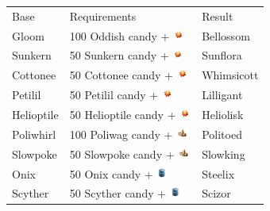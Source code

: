 \begin{table}[ht]
\footnotesize
\begin{center}
  \begin{tabular}{lll}
    Base & Requirements & Result \\
    \Midrule
    Gloom & 100 Oddish candy + \includegraphics[width=1em,height=1em]{images/sunstone.png} & Bellossom \\
    Sunkern & 50 Sunkern candy + \includegraphics[width=1em,height=1em]{images/sunstone.png} & Sunflora \\
    Cottonee & 50 Cottonee candy + \includegraphics[width=1em,height=1em]{images/sunstone.png} & Whimsicott \\
    Petilil & 50 Petilil candy + \includegraphics[width=1em,height=1em]{images/sunstone.png} & Lilligant \\
    Helioptile & 50 Helioptile candy + \includegraphics[width=1em,height=1em]{images/sunstone.png} & Heliolisk \\
    Poliwhirl & 100 Poliwag candy + \includegraphics[width=1em,height=1em]{images/kingsrock.png} & Politoed \\
    Slowpoke & 50 Slowpoke candy + \includegraphics[width=1em,height=1em]{images/kingsrock.png} & Slowking \\
    Onix & 50 Onix candy + \includegraphics[width=1em,height=1em]{images/metalcoat.png} & Steelix \\
    Scyther & 50 Scyther candy + \includegraphics[width=1em,height=1em]{images/metalcoat.png} & Scizor \\

\end{tabular}
\end{center}
\end{table}
